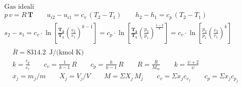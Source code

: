 \documentclass[9pt]{article}
\begin{document}
\begin{multicols}{2}
\begin{gather*}
		\text{Gas ideali}\\
		p\,v=R\, \mathbf{T}\qquad
		u_{i2}-u_{i1} = c_v \, (T_2 - T_1)\qquad
		h_2-h_1=c_p \, (T_2 - T_1) \\
		s_2 - s_1 = c_v \cdot \ln \left[ \frac{\mathbf{T_2}}{\mathbf{T_1}} \left( \frac{v_2}{v_1} \right)^{k-1} \right] = c_p \cdot \ln \left[ \frac{\mathbf{T_2}}{\mathbf{T_1}} \left( \frac{p_2}{p_1} \right)^{\frac{1-k}{k}} \right] = c_v \cdot \ln \left[ \frac{p_2}{p_1} \left( \frac{v_2}{v_1} \right)^k \right]
		\\
		\begin{split}
			& \overline{R} = 8314.2 \,\,\, \text{J/(kmol K)}\\
			& k = \frac{c_p}{c_v} \qquad c_v = \frac{1}{k-1} \, R \qquad c_p = \frac{k}{k-1} \, R \qquad R = \frac{\overline{R}}{M_m} \qquad k = \frac{\psi +2}{\psi}\\
			&x_j = m_j/m \qquad X_j = V_j/V \qquad M=\Sigma X_j \, M_j \qquad c_v = \Sigma x_j c_{v_j} \qquad c_p = \Sigma x_j c_{p _j}\\\\
		\end{split}
	\end{gather*}
	

\end{multicols}
\end{document}
